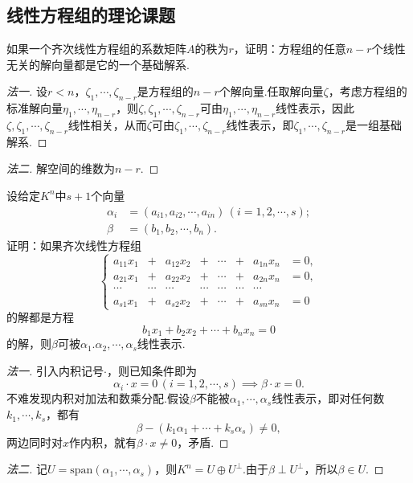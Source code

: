 \subsection{线性方程组的理论课题}
\begin{prob}[3]
	如果一个齐次线性方程组的系数矩阵$A$的秩为$r$，\hypertarget{BasicSolution}{证明}：方程组的任意$n-r$个线性无关的解向量都是它的一个基础解系.
\end{prob}
\begin{proof}[法一]
	设$r<n$，$\zeta_1,\cdots,\zeta_{n-r}$是方程组的$n-r$个解向量.任取解向量$\zeta$，考虑方程组的标准解向量$\eta_1,\cdots,\eta_{n-r}$，则$\zeta,\zeta_1,\cdots,\zeta_{n-r}$可由$\eta_1,\cdots,\eta_{n-r}$线性表示，因此$\zeta,\zeta_1,\cdots,\zeta_{n-r}$线性相关，从而$\zeta$可由$\zeta_1,\cdots,\zeta_{n-r}$线性表示，即$\zeta_1,\cdots,\zeta_{n-r}$是一组基础解系.
\end{proof}
\begin{proof}[法二]
	解空间的维数为$n-r$.
\end{proof}
\begin{prob}[4]
	设给定$K^n$中$s+1$个向量
	\begin{align*}
		\alpha_i & =(a_{i1},a_{i2},\cdots,a_{in})\,(i=1,2,\cdots,s); \\
		\beta    & =(b_1,b_2,\cdots,b_n).
	\end{align*}
	证明：如果齐次线性方程组
	\[\left\{
		\begin{array}{cccccccc}
			a_{11}x_1 & +      & a_{12}x_2 & +      & \cdots & +      & a_{1n}x_n & =0, \\
			a_{21}x_1 & +      & a_{22}x_2 & +      & \cdots & +      & a_{2n}x_n & =0, \\
			\cdots    & \cdots & \cdots    & \cdots & \cdots & \cdots & \cdots          \\
			a_{s1}x_1 & +      & a_{s2}x_2 & +      & \cdots & +      & a_{sn}x_n & =0
		\end{array}
		\right.\]
	的解都是方程
	\[
		b_1x_1+b_2x_2+\cdots+b_nx_n=0
	\]
	的解，则$\beta$可被$\alpha_1.\alpha_2,\cdots,\alpha_s$线性表示.
\end{prob}
\begin{proof}[法一]
	引入内积记号$\cdot$，则已知条件即为
	\[
		\alpha_i\cdot x=0\,(i=1,2,\cdots,s)\implies \beta\cdot x=0.
	\]
	不难发现内积对加法和数乘分配.假设$\beta$不能被$\alpha_1,\cdots,\alpha_s$线性表示，即对任何数$k_1,\cdots,k_s$，都有
	\[
		\beta-(k_1\alpha_1+\cdots+k_s\alpha_s)\ne0,
	\]
	两边同时对$x$作内积，就有$\beta\cdot x\ne0$，矛盾.
\end{proof}
\begin{proof}[法二]
	记$U=\mathrm{span}(\alpha_1,\cdots,\alpha_s)$，则$K^n=U\oplus U^{\perp}$.由于$\beta\perp U^{\perp}$，所以$\beta\in U$.
\end{proof}
